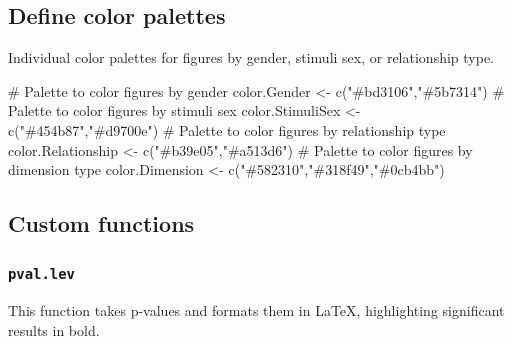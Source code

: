 \documentclass[
  bookmarksnumbered]{article}
\newenvironment{Shaded}{\begin{snugshade}}{\end{snugshade}}
\newcommand{\CommentTok}[1]{\textcolor[rgb]{0.50,0.62,0.50}{#1}}
\newcommand{\FunctionTok}[1]{\textcolor[rgb]{0.94,0.94,0.56}{#1}}
\newcommand{\NormalTok}[1]{\textcolor[rgb]{0.80,0.80,0.80}{#1}}
\newcommand{\OtherTok}[1]{\textcolor[rgb]{0.94,0.94,0.56}{#1}}
\newcommand{\StringTok}[1]{\textcolor[rgb]{0.80,0.58,0.58}{#1}}
\begin{document}
\subsection{Define color palettes}\label{define-color-palettes}

Individual color palettes for figures by gender, stimuli sex, or relationship type.

\begin{Shaded}
\begin{Highlighting}[]
\CommentTok{\# Palette to color figures by gender}
\NormalTok{color.Gender }\OtherTok{\textless{}{-}} \FunctionTok{c}\NormalTok{(}\StringTok{"\#bd3106"}\NormalTok{,}\StringTok{"\#5b7314"}\NormalTok{)}
\CommentTok{\# Palette to color figures by stimuli sex}
\NormalTok{color.StimuliSex }\OtherTok{\textless{}{-}} \FunctionTok{c}\NormalTok{(}\StringTok{"\#454b87"}\NormalTok{,}\StringTok{"\#d9700e"}\NormalTok{)}
\CommentTok{\# Palette to color figures by relationship type}
\NormalTok{color.Relationship }\OtherTok{\textless{}{-}} \FunctionTok{c}\NormalTok{(}\StringTok{"\#b39e05"}\NormalTok{,}\StringTok{"\#a513d6"}\NormalTok{)}
\CommentTok{\# Palette to color figures by dimension type}
\NormalTok{color.Dimension }\OtherTok{\textless{}{-}} \FunctionTok{c}\NormalTok{(}\StringTok{"\#582310"}\NormalTok{,}\StringTok{"\#318f49"}\NormalTok{,}\StringTok{"\#0cb4bb"}\NormalTok{)}
\end{Highlighting}
\end{Shaded}

\subsection{Custom functions}\label{custom-functions}

\subsubsection{\texorpdfstring{\texttt{pval.lev}}{pval.lev}}\label{pval.lev}

This function takes p-values and formats them in \LaTeX, highlighting significant results in bold.
\end{document}
